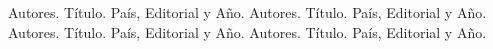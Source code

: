 \begin{thebibliography}{XXX0000}
     Autores. Título. País, Editorial y Año.
     Autores. Título. País, Editorial y Año.
     Autores. Título. País, Editorial y Año.
     Autores. Título. País, Editorial y Año.
\end{thebibliography}